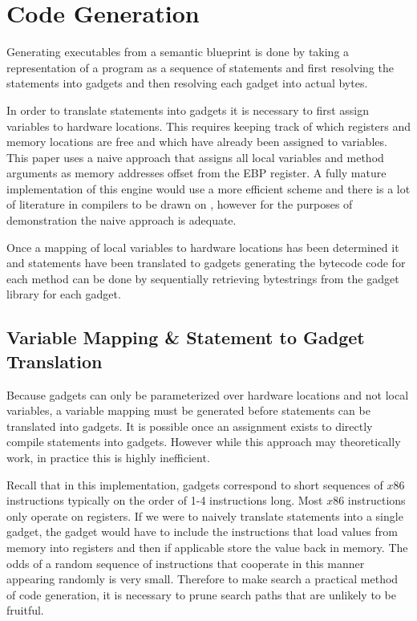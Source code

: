     \section{Code Generation}

    Generating executables from a semantic blueprint is done by taking a
    representation of a program as a sequence of statements and first resolving
    the statements into gadgets and then resolving each gadget into actual
    bytes.

    In order to translate statements into gadgets it is necessary to first
    assign variables to hardware locations. This requires keeping track of which
    registers and memory locations are free and which have already been assigned
    to variables. This paper uses a naive approach that assigns all local
    variables and method arguments as memory addresses offset from the EBP
    register. A fully mature implementation of this engine would use a more
    efficient scheme and there is a lot of literature in compilers to be drawn
    on \cite{COMPILER-REGISTER-MAPPING}, however for the purposes of
    demonstration the naive approach is adequate.


    Once a mapping of local variables to hardware locations has been determined
    it and statements have been translated to gadgets generating the bytecode
    code for each method can be done by sequentially retrieving bytestrings
    from the gadget library for each gadget. 

    \subsection{Variable Mapping \& Statement to Gadget Translation}

    Because gadgets can only be parameterized over hardware locations and not
    local variables, a variable mapping must be generated before statements can
    be translated into gadgets. It is possible once an assignment exists to
    directly compile statements into gadgets. However while this approach may
    theoretically work, in practice this is highly inefficient.
    

    Recall that in this implementation, gadgets correspond to short sequences of
    $x86$ instructions typically on the order of 1-4 instructions long. Most
    $x86$ instructions only operate on registers. If we were to naively
    translate statements into a single gadget, the gadget would have to include
    the instructions that load values from memory into registers and then if
    applicable store the value back in memory. The odds of a random sequence of
    instructions that cooperate in this manner appearing randomly is very
    small. Therefore to make search a practical method of code generation, it is
    necessary to prune search paths that are unlikely to be fruitful.

